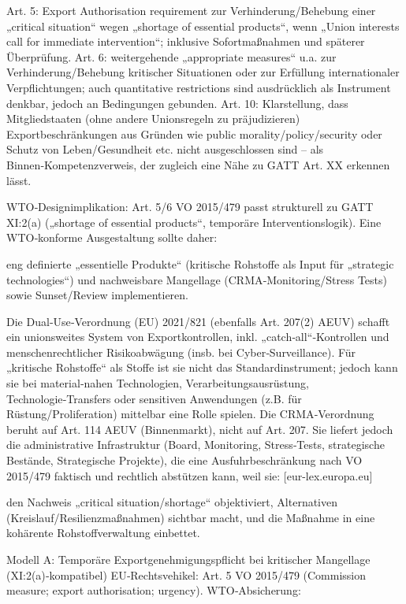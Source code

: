 \documentclass[12pt,a4paper,oneside]{book} %
\begin{document}
Art. 5: Export Authorisation requirement zur Verhinderung/Behebung einer „critical situation“ wegen „shortage of essential products“, wenn „Union interests call for immediate intervention“; inklusive Sofortmaßnahmen und späterer Überprüfung. 
Art. 6: weitergehende „appropriate measures“ u.a. zur Verhinderung/Behebung kritischer Situationen oder zur Erfüllung internationaler Verpflichtungen; auch quantitative restrictions sind ausdrücklich als Instrument denkbar, jedoch an Bedingungen gebunden. 
Art. 10: Klarstellung, dass Mitgliedstaaten (ohne andere Unionsregeln zu präjudizieren) Exportbeschränkungen aus Gründen wie public morality/policy/security oder Schutz von Leben/Gesundheit etc. nicht ausgeschlossen sind – als Binnen‑Kompetenzverweis, der zugleich eine Nähe zu GATT Art. XX erkennen lässt. 

WTO‑Designimplikation: Art. 5/6 VO 2015/479 passt strukturell zu GATT XI:2(a) („shortage of essential products“, temporäre Interventionslogik). Eine WTO‑konforme Ausgestaltung sollte daher:

eng definierte „essentielle Produkte“ (kritische Rohstoffe als Input für „strategic technologies“) und
nachweisbare Mangellage (CRMA‑Monitoring/Stress Tests) sowie
Sunset/Review implementieren.

Die Dual‑Use‑Verordnung (EU) 2021/821 (ebenfalls Art. 207(2) AEUV) schafft ein unionsweites System von Exportkontrollen, inkl. „catch‑all“‑Kontrollen und menschenrechtlicher Risikoabwägung (insb. bei Cyber‑Surveillance). 
Für „kritische Rohstoffe“ als Stoffe ist sie nicht das Standardinstrument; jedoch kann sie bei material‑nahen Technologien, Verarbeitungsausrüstung, Technologie‑Transfers oder sensitiven Anwendungen (z.B. für Rüstung/Proliferation) mittelbar eine Rolle spielen. Die CRMA‑Verordnung beruht auf Art. 114 AEUV (Binnenmarkt), nicht auf Art. 207. 
Sie liefert jedoch die administrative Infrastruktur (Board, Monitoring, Stress‑Tests, strategische Bestände, Strategische Projekte), die eine Ausfuhrbeschränkung nach VO 2015/479 faktisch und rechtlich abstützen kann, weil sie: [eur-lex.europa.eu]

den Nachweis „critical situation/shortage“ objektiviert,
Alternativen (Kreislauf/Resilienzmaßnahmen) sichtbar macht,
und die Maßnahme in eine kohärente Rohstoffverwaltung einbettet.

Modell A: Temporäre Exportgenehmigungspflicht bei kritischer Mangellage (XI:2(a)‑kompatibel)
EU‑Rechtsvehikel: Art. 5 VO 2015/479 (Commission measure; export authorisation; urgency). 
WTO‑Absicherung:
\end{document}
